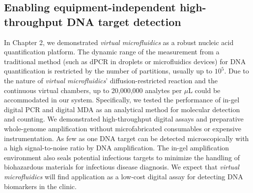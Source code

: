 \subsection{Enabling equipment-independent high-throughput DNA target detection}
In Chapter 2, we demonstrated \textit{virtual microfluidics} as a robust nucleic acid quantification platform. The dynamic range of the measurement from a traditional method (such as dPCR in droplets or microfluidics devices) for DNA quantification is restricted by the number of partitions, usually up to $10^5$. Due to the nature of \textit{virtual microfluidics}' diffusion-restricted reaction and the continuous virtual chambers, up to 20,000,000 analytes per $\mu$L could be accommodated in our system. Specifically, we tested the performance of in-gel digital PCR and digital MDA as an analytical method for molecular detection and counting. We demonstrated high-throughput digital assays and preparative whole-genome amplification without microfabricated consumables or expensive instrumentation. As few as one DNA target can be detected microscopically with a high signal-to-noise ratio by DNA amplification. The in-gel amplification environment also seals potential infectious targets to minimize the handling of biohazardous materials for infectious disease diagnosis. We expect that \textit{virtual microfluidics} will find application as a low-cost digital assay for detecting DNA biomarkers in the clinic. 


